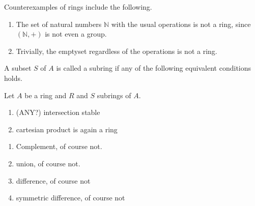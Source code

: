 %
%
%
\begin{example}
    Counterexamples of rings include the following.
    \begin{enumerate}
        \item The set of natural numbers \(\mathbb{N}\) with the usual operations is not a ring, since \((\mathbb{N}, +)\) is not even a group.
        \item Trivially, the emptyset regardless of the operations is not a ring.
    \end{enumerate}
\end{example}
%
%
%
\begin{defbox}
    \begin{definition}[Subring]
        A subset \(S\) of \(A\) is called a subring if any of the following equivalent conditions holds.
    \end{definition}
\end{defbox}
%
%
%
\begin{thmbox}
    \begin{proposition}
        Let \(A\) be a ring and \(R\) and \(S\) subrings of \(A\).
        \begin{enumerate}
            \item (ANY?) intersection stable
            \item cartesian product is again a ring
        \end{enumerate}
    \end{proposition}
\end{thmbox}
%
%
%
\begin{exmbox}
    \begin{example}
        \begin{enumerate}
            \item Complement, of course not.
            \item union, of course not.
            \item difference, of course not
            \item symmetric difference, of course not
        \end{enumerate}
    \end{example}
\end{exmbox}

